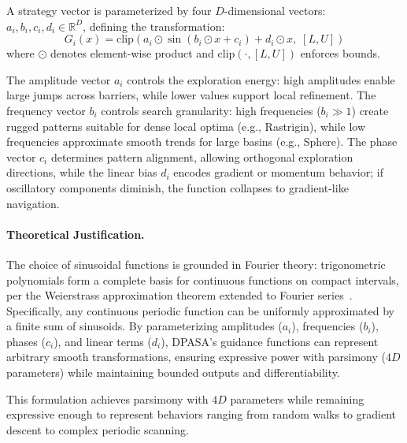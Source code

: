 \documentclass[11pt]{article}
\begin{document}
A strategy vector is parameterized by four $D$-dimensional vectors: $a_i, b_i, c_i, d_i \in \mathbb{R}^D$, defining the transformation:
\begin{equation}
G_i(x) = \text{clip}\left( a_i \odot \sin(b_i \odot x + c_i) + d_i \odot x, \; [L, U] \right)
\label{eq:guidance_detailed}
\end{equation}
where $\odot$ denotes element-wise product and $\text{clip}(\cdot, [L, U])$ enforces bounds.

The amplitude vector $a_i$ controls the exploration energy: high amplitudes enable large jumps across barriers, while lower values support local refinement. The frequency vector $b_i$ controls search granularity: high frequencies ($b_i \gg 1$) create rugged patterns suitable for dense local optima (e.g., Rastrigin), while low frequencies approximate smooth trends for large basins (e.g., Sphere). The phase vector $c_i$ determines pattern alignment, allowing orthogonal exploration directions, while the linear bias $d_i$ encodes gradient or momentum behavior; if oscillatory components diminish, the function collapses to gradient-like navigation.

\paragraph{Theoretical Justification.} The choice of sinusoidal functions is grounded in Fourier theory: trigonometric polynomials form a complete basis for continuous functions on compact intervals, per the Weierstrass approximation theorem extended to Fourier series~\citep{folland1999real}. Specifically, any continuous periodic function can be uniformly approximated by a finite sum of sinusoids. By parameterizing amplitudes ($a_i$), frequencies ($b_i$), phases ($c_i$), and linear terms ($d_i$), DPASA's guidance functions can represent arbitrary smooth transformations, ensuring expressive power with parsimony ($4D$ parameters) while maintaining bounded outputs and differentiability.

This formulation achieves parsimony with $4D$ parameters while remaining expressive enough to represent behaviors ranging from random walks to gradient descent to complex periodic scanning.
\end{document}
